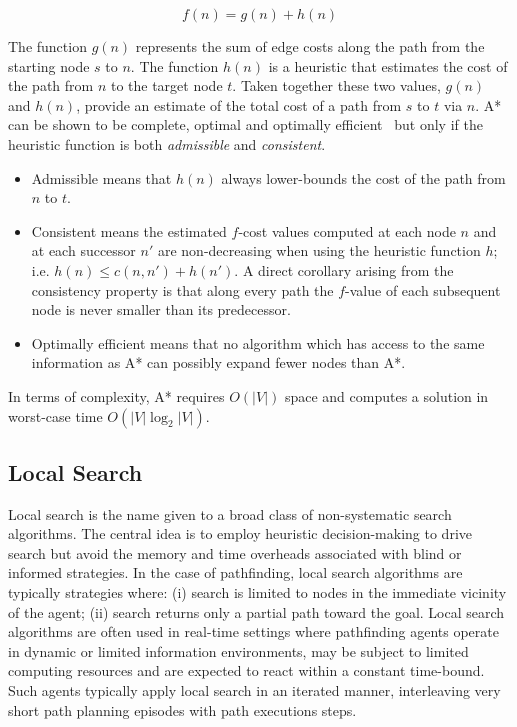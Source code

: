 \begin{equation}
f(n) = g(n) + h(n)
\end{equation}

The function $g(n)$ represents the sum of edge costs along the path from the
starting node $s$ to $n$. The function $h(n)$ is a heuristic that estimates the
cost of the path from $n$ to the target node $t$.  Taken together these two
values, $g(n)$ and $h(n)$, provide an estimate of the total cost of a path from
$s$ to $t$ via $n$.  A{*} can be shown to be complete, optimal and optimally
efficient~\citep{dechter85} but only if the heuristic function is both
\emph{admissible} and \emph{consistent}. 
\begin{itemize}
\item Admissible means that $h(n)$ always
lower-bounds the cost of the path from $n$ to $t$. 
\item Consistent means the estimated $f$-cost values computed at each node $n$ and at 
each successor $n'$ are non-decreasing when using the heuristic function $h$; 
i.e.  $h(n) \le c(n, n') + h(n')$. A direct corollary arising from the consistency
property is that along every path the $f$-value of each subsequent node is never 
smaller than its predecessor.
\item Optimally efficient means that no
algorithm which has access to the same information as A{*} can possibly
expand fewer nodes than A{*}.
\end{itemize}
In terms of complexity, A{*} requires $O(|V|)$ space and computes a solution in 
worst-case time $O(|V|\log_2{|V|})$.

\subsection{Local Search}
\label{cha::lit::search::local}
Local search is the name given to a broad class of non-systematic search algorithms.
The central idea is to employ heuristic decision-making to drive search but 
avoid the memory and time overheads associated with blind or informed strategies.
In the case of pathfinding, local search algorithms are typically strategies where:
(i) search is limited to nodes in the immediate vicinity of the agent; 
(ii) search returns only a partial path toward the goal.  Local search
algorithms are often used in real-time settings where pathfinding agents
operate in dynamic or limited information environments, may be subject to
limited computing resources and are expected to react within a constant
time-bound.  Such agents typically apply local search in an iterated manner,
interleaving very short path planning episodes with path executions steps.

